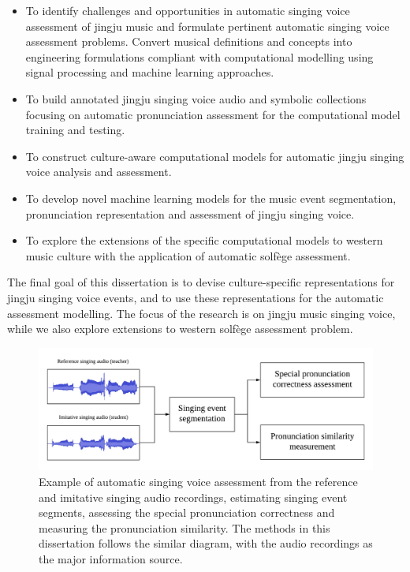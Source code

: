 \begin{itemize}[leftmargin=*]
\item To identify challenges and opportunities in automatic singing voice assessment of jingju music and formulate pertinent automatic singing voice assessment problems. Convert musical definitions and concepts into engineering formulations compliant with computational modelling using signal processing and machine learning approaches.
\item To build annotated jingju singing voice audio and symbolic collections focusing on automatic pronunciation assessment for the computational model training and testing.
\item To construct culture-aware computational models for automatic jingju singing voice analysis and assessment.
\item To develop novel machine learning models for the music event segmentation, pronunciation representation and assessment of jingju singing voice.
\item To explore the extensions of the specific computational models to western music culture with the application of automatic solfège assessment. 
\end{itemize}

The final goal of this dissertation is to devise culture-specific representations for jingju singing voice events, and to use these representations for the automatic assessment modelling. The focus of the research is on jingju music singing voice, while we also explore extensions to western solfège assessment problem.

\begin{figure}
\centering
\includegraphics[scale=0.2]{figs/blockDiags_rong/ch1_motivation_audio.png}
\caption[Example of automatic singing voice assessment from the reference and imitative singing audio recordings]{Example of automatic singing voice assessment from the reference and imitative singing audio recordings, estimating singing event segments, assessing the special pronunciation correctness and measuring the pronunciation similarity. The methods in this dissertation follows the similar diagram, with the audio recordings as the major information source.}\label{fig:intro:chapread}
\end{figure}

